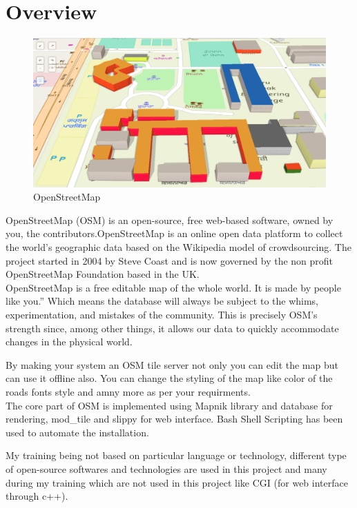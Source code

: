 \section{Overview}

\begin{figure}[H]
        \centering \includegraphics[scale=0.31]{input/images/osm_building.png}
        \caption{OpenStreetMap}
        \label{fig:openscadlogo}
\end{figure}

OpenStreetMap (OSM) is an open-source, free web-based software, owned by you, the contributors.OpenStreetMap is an online open data platform to collect the world's geographic data based on the Wikipedia model of crowdsourcing. The project started in 2004 by Steve Coast and is now governed by the non profit OpenStreetMap Foundation based in the UK.\\ 


OpenStreetMap is a free editable map of the whole world. It is made by people like you.” Which
means the database will always be subject to the whims, experimentation, and mistakes of the
community. This is precisely OSM’s strength since, among other things, it allows our data to
quickly accommodate changes in the physical world.


By making your system an OSM tile server not only you can edit the map but can use it offline
also. You can change the styling of the map like color of the roads fonts style and amny more as
per your requirments.\\


The core part of OSM is implemented using Mapnik library and database for rendering, mod\_tile and slippy
for web interface. Bash Shell Scripting has been used to automate the installation.


My training being not based on particular language or technology, different type of open-source softwares and technologies are
used in this project and many during my training which are not used in this
project like CGI (for web interface through c++).

